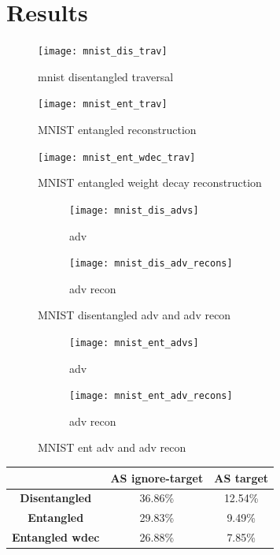 \documentclass{report}
\begin{document}
\chapter{Results}

\begin{figure}
\begin{center}
\texttt{[image: mnist\_dis\_trav]}
\end{center}
\caption{mnist disentangled traversal}
\end{figure}

\begin{figure}
\begin{center}
\texttt{[image: mnist\_ent\_trav]}
\end{center}
\caption{MNIST entangled reconstruction}
\end{figure}

\begin{figure}
\begin{center}
\texttt{[image: mnist\_ent\_wdec\_trav]}
\end{center}
\caption{MNIST entangled weight decay reconstruction}
\end{figure}

\begin{figure}
\begin{subfigure}{.5\textwidth}
  \centering
  \texttt{[image: mnist\_dis\_advs]}
  \caption{adv}
\end{subfigure}%
\begin{subfigure}{.5\textwidth}
  \centering
  \texttt{[image: mnist\_dis\_adv\_recons]}
  \caption{adv recon}
\end{subfigure}
\caption{MNIST disentangled adv and adv recon}
\label{fig:mnist-dis-advs}
\end{figure}

\begin{figure}
\begin{subfigure}{.5\textwidth}
  \centering
  \texttt{[image: mnist\_ent\_advs]}
  \caption{adv}
\end{subfigure}%
\begin{subfigure}{.5\textwidth}
  \centering
  \texttt{[image: mnist\_ent\_adv\_recons]}
  \caption{adv recon}
\end{subfigure}
\caption{MNIST ent adv and adv recon}
\label{fig:mnist-ent-advs}
\end{figure}

\begin{center}
  \begin{tabular}{|c|c|c|}
  \hline
   & \textbf{AS ignore-target} & \textbf{AS target} \\ \hline
  \textbf{Disentangled} & 36.86\% & 12.54\% \\ \hline
  \textbf{Entangled} & 29.83\% & 9.49\% \\ \hline
  \textbf{Entangled wdec} & 26.88\% & 7.85\% \\ \hline
  \end{tabular}
\end{center}
\end{document}
